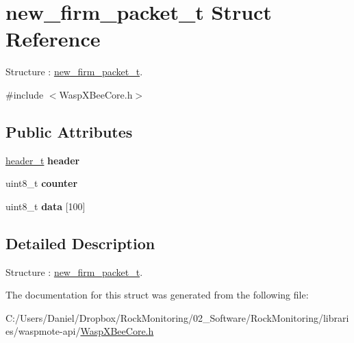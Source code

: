 \hypertarget{structnew__firm__packet__t}{}\section{new\+\_\+firm\+\_\+packet\+\_\+t Struct Reference}
\label{structnew__firm__packet__t}


Structure \+: \hyperlink{structnew__firm__packet__t}{new\+\_\+firm\+\_\+packet\+\_\+t}.  




{\ttfamily \#include $<$Wasp\+X\+Bee\+Core.\+h$>$}

\subsection*{Public Attributes}
\begin{DoxyCompactItemize}
\item 
\hyperlink{structheader__t}{header\+\_\+t} {\bfseries header}\hypertarget{structnew__firm__packet__t_ab06c1cb365f98a11f4df31af1e292838}{}\label{structnew__firm__packet__t_ab06c1cb365f98a11f4df31af1e292838}

\item 
uint8\+\_\+t {\bfseries counter}\hypertarget{structnew__firm__packet__t_ae0c9d92e65ec750396037411b84e4cce}{}\label{structnew__firm__packet__t_ae0c9d92e65ec750396037411b84e4cce}

\item 
uint8\+\_\+t {\bfseries data} \mbox{[}100\mbox{]}\hypertarget{structnew__firm__packet__t_acb9eca271a2252051fed7bfd3e6c785c}{}\label{structnew__firm__packet__t_acb9eca271a2252051fed7bfd3e6c785c}

\end{DoxyCompactItemize}


\subsection{Detailed Description}
Structure \+: \hyperlink{structnew__firm__packet__t}{new\+\_\+firm\+\_\+packet\+\_\+t}. 

The documentation for this struct was generated from the following file\+:\begin{DoxyCompactItemize}
\item 
C\+:/\+Users/\+Daniel/\+Dropbox/\+Rock\+Monitoring/02\+\_\+\+Software/\+Rock\+Monitoring/libraries/waspmote-\/api/\hyperlink{_wasp_x_bee_core_8h}{Wasp\+X\+Bee\+Core.\+h}\end{DoxyCompactItemize}
